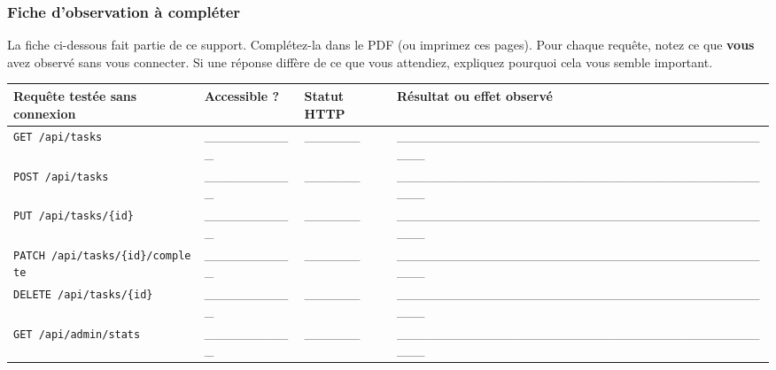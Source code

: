 \documentclass[
  french,
  10pt,
  a4paper,
]{article}
\newcounter{none} %
\begin{document}
\subsubsection{Fiche d'observation à
compléter}\label{fiche-dobservation-uxe0-compluxe9ter}

La fiche ci-dessous fait partie de ce support. Complétez-la dans le PDF
(ou imprimez ces pages). Pour chaque requête, notez ce que \textbf{vous}
avez observé sans vous connecter. Si une réponse diffère de ce que vous
attendiez, expliquez pourquoi cela vous semble important.

{\def\LTcaptype{none} %
\begin{longtable}[]{@{}
  >{\raggedright\arraybackslash}p{}
  >{\raggedright\arraybackslash}p{}
  >{\raggedright\arraybackslash}p{}
  >{\raggedright\arraybackslash}p{}@{}}
\toprule\noalign{}
\begin{minipage}[b]{\linewidth}\raggedright
Requête testée sans connexion
\end{minipage} & \begin{minipage}[b]{\linewidth}\raggedright
Accessible ?
\end{minipage} & \begin{minipage}[b]{\linewidth}\raggedright
Statut HTTP
\end{minipage} & \begin{minipage}[b]{\linewidth}\raggedright
Résultat ou effet observé
\end{minipage} \\
\midrule\noalign{}
\endhead
\bottomrule\noalign{}
\endlastfoot
\texttt{GET\ /api/tasks} & \_\_\_\_\_\_\_\_\_\_ & \_\_\_\_\_\_ &
\_\_\_\_\_\_\_\_\_\_\_\_\_\_\_\_\_\_\_\_\_\_\_\_\_\_\_\_\_\_\_\_\_\_\_\_\_\_\_\_\_\_ \\
\texttt{POST\ /api/tasks} & \_\_\_\_\_\_\_\_\_\_ & \_\_\_\_\_\_ &
\_\_\_\_\_\_\_\_\_\_\_\_\_\_\_\_\_\_\_\_\_\_\_\_\_\_\_\_\_\_\_\_\_\_\_\_\_\_\_\_\_\_ \\
\texttt{PUT\ /api/tasks/\{id\}} & \_\_\_\_\_\_\_\_\_\_ & \_\_\_\_\_\_ &
\_\_\_\_\_\_\_\_\_\_\_\_\_\_\_\_\_\_\_\_\_\_\_\_\_\_\_\_\_\_\_\_\_\_\_\_\_\_\_\_\_\_ \\
\texttt{PATCH\ /api/tasks/\{id\}/complete} & \_\_\_\_\_\_\_\_\_\_ &
\_\_\_\_\_\_ &
\_\_\_\_\_\_\_\_\_\_\_\_\_\_\_\_\_\_\_\_\_\_\_\_\_\_\_\_\_\_\_\_\_\_\_\_\_\_\_\_\_\_ \\
\texttt{DELETE\ /api/tasks/\{id\}} & \_\_\_\_\_\_\_\_\_\_ & \_\_\_\_\_\_
&
\_\_\_\_\_\_\_\_\_\_\_\_\_\_\_\_\_\_\_\_\_\_\_\_\_\_\_\_\_\_\_\_\_\_\_\_\_\_\_\_\_\_ \\
\texttt{GET\ /api/admin/stats} & \_\_\_\_\_\_\_\_\_\_ & \_\_\_\_\_\_ &
\_\_\_\_\_\_\_\_\_\_\_\_\_\_\_\_\_\_\_\_\_\_\_\_\_\_\_\_\_\_\_\_\_\_\_\_\_\_\_\_\_\_ \\
\end{longtable}
}
\end{document}
